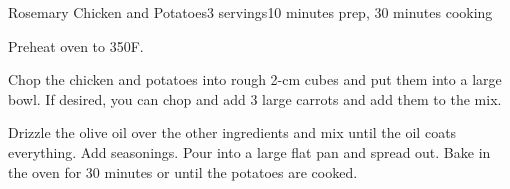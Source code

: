 \documentclass[../Cookbook.tex]{subfiles}
\begin{document}
\begin{recipe}{Rosemary Chicken and Potatoes}{3 servings}{10 minutes prep, 30 minutes cooking}

Preheat oven to 350\0F.

Chop the chicken and potatoes into rough 2-cm cubes and put them into a large bowl. If desired, you can chop and add 3 large carrots and add them to the mix.

Drizzle the olive oil over the other ingredients and mix until the oil coats everything. Add seasonings. Pour into a large flat pan and spread out. Bake in the oven for 30 minutes or until the potatoes are cooked.


\end{recipe}
\end{document}
